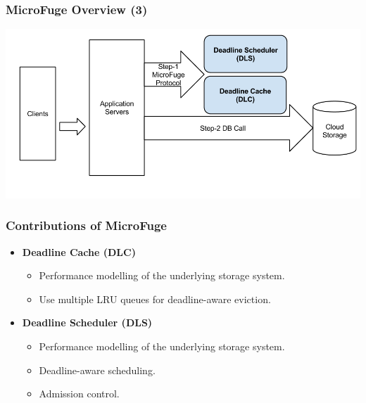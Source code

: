 \documentclass{beamer}
\newcommand{\myv}{\vspace{3 mm}}
\begin{document}
\begin{frame}
  \frametitle{MicroFuge Overview (3)}
  \begin{center}
  \includegraphics[scale=0.32]{img/MF_FULL_NEW_3.png}
  \end{center}
\end{frame}



\begin{frame}
  \frametitle{Contributions of MicroFuge}
  \vspace{-10 mm}
  \begin{itemize}
  \item \textbf{Deadline Cache (DLC)}
    \myv
    \begin{itemize}
    \item Performance modelling of the underlying storage system.
      \myv
    \item Use multiple LRU queues for deadline-aware eviction.
    \end{itemize}
    \myv
  \item \textbf{Deadline Scheduler (DLS)}
    \begin{itemize}
      \myv
    \item Performance modelling of the underlying storage system.
      \myv
    \item Deadline-aware scheduling.
      \myv
    \item \textcolor[gray]{0.5} {Admission control}.
    \end{itemize}
  \end{itemize}
\end {frame}
\end{document}
